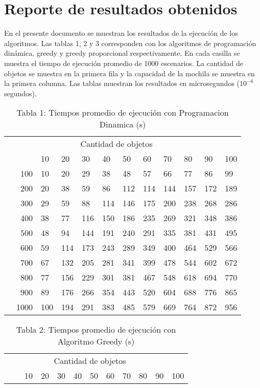 \documentclass{article}
\begin{document}
\section*{Reporte de resultados obtenidos}
En el presente documento se muestran los resultados de la ejecución de los algoritmos. Las tablas 1, 2 y 3 corresponden con los algoritmos de programación dinámica, greedy y greedy proporcional respectivamente. En cada casilla se muestra el tiempo de ejecución promedio de 1000 escenarios. La cantidad de objetos se muestra en la primera fila y la capacidad de la mochila se muestra en la primera columna. Las tablas muestran los resultados en microsegundos ($10^{-6}$ segundos).
\begin{center}
\begin{table}[ht]
\centering
\caption*{Tabla 1: Tiempos promedio de ejecución con Programacion Dinamica (\textmu s)}
\label{1}
\begin{tabularx}{0.8\textwidth}{Xr|XXXXXXXXXX}
&\multicolumn{10}{c}{Cantidad de objetos} \\
&&10&20&30&40&50&60&70&80&90&100\\\hline
\parbox[t]{2mm}{}&100&10&20&29&38&48&57&66&77&86&99\\
&200&20&38&59&86&112&114&144&157&172&189\\
&300&29&59&88&114&146&175&200&238&268&286\\
&400&38&77&116&150&186&235&269&321&348&386\\
&500&48&94&144&191&240&291&335&381&431&495\\
&600&59&114&173&243&289&349&400&464&529&566\\
&700&67&132&205&281&341&399&478&544&602&672\\
&800&77&156&229&301&381&467&548&618&694&770\\
&900&89&176&266&354&443&520&604&688&776&865\\
&1000&100&194&291&383&485&579&669&764&872&956\\
\end{tabularx}
\end{table}
\begin{table}[ht]
\centering
\caption*{Tabla 2: Tiempos promedio de ejecución con Algoritmo Greedy (\textmu s)}
\label{2}
\begin{tabularx}{0.8\textwidth}{Xr|XXXXXXXXXX}
&\multicolumn{10}{c}{Cantidad de objetos} \\
&&10&20&30&40&50&60&70&80&90&100\\\hline

\end{tabularx}
\end{table}
\end{center}
\end{document}
